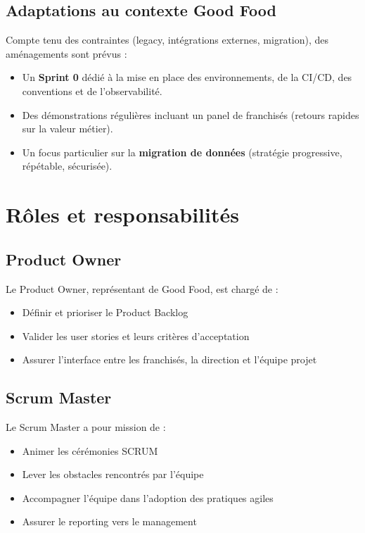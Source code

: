 \subsection{Adaptations au contexte Good Food}
Compte tenu des contraintes (legacy, intégrations externes, migration), des aménagements sont prévus :
\begin{itemize}
    \item Un \textbf{Sprint 0} dédié à la mise en place des environnements, de la CI/CD, des conventions et de l’observabilité.
    \item Des démonstrations régulières incluant un panel de franchisés (retours rapides sur la valeur métier).
    \item Un focus particulier sur la \textbf{migration de données} (stratégie progressive, répétable, sécurisée).
\end{itemize}

\section{Rôles et responsabilités}

\subsection{Product Owner}
Le Product Owner, représentant de Good Food, est chargé de :
\begin{itemize}
    \item Définir et prioriser le Product Backlog
    \item Valider les user stories et leurs critères d’acceptation
    \item Assurer l’interface entre les franchisés, la direction et l’équipe projet
\end{itemize}

\subsection{Scrum Master}
Le Scrum Master a pour mission de :
\begin{itemize}
    \item Animer les cérémonies SCRUM
    \item Lever les obstacles rencontrés par l’équipe
    \item Accompagner l’équipe dans l’adoption des pratiques agiles
    \item Assurer le reporting vers le management
\end{itemize}

